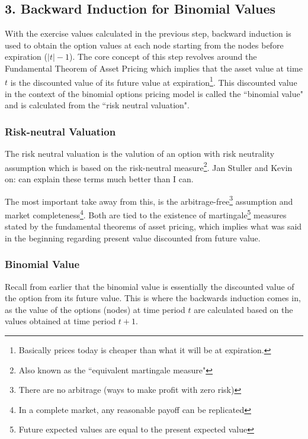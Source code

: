 \documentclass[12pt, letterpaper]{article}\usepackage{float}
\begin{document}
\pagebreak
\subsection*{3. Backward Induction for Binomial Values}
With the exercise values calculated in the previous step, backward induction is used to obtain the option values at each node starting from the nodes before expiration (${\vert t \vert - 1}$).
The core concept of this step revolves around the Fundamental Theorem of Asset Pricing which implies that the asset value at time ${t}$ is the discounted value of its future value at expiration\footnote{Basically prices today is cheaper than what it will be at expiration.}\cite{blythevideo}\cite{ftapwikipedia}.
This discounted value in the context of the binomial options pricing model is called the ``binomial value" and is calculated from the ``risk neutral valuation".

\subsubsection*{Risk-neutral Valuation}
The risk neutral valuation is the valution of an option with risk neutrality assumption\cite{riskneutralvalutionwikipedia} which is based on the risk-neutral measure\footnote{Also known as the ``equivalent martingale measure"}\cite{riskneutralmeasurewikipedia}.
Jan Stuller and Kevin on: \href{https://quant.stackexchange.com/questions/55239/what-is-the-risk-neutral-measure}{\color{blue}{quant.stackexchange}} can explain these terms much better than I can.

\medskip

The most important take away from this, is the arbitrage-free\footnote{There are no arbitrage (ways to make profit with zero risk)} assumption and market completeness\footnote{In a complete market, any reasonable payoff can be replicated\cite{riskneutralmeasurestackexchange}}.
Both are tied to the existence of martingale\footnote{Future expected values are equal to the present expected value} measures stated by the fundamental theorems of asset pricing\cite{ftapwikipedia}, which implies what was said in the beginning regarding present value discounted from future value.


\subsubsection*{Binomial Value}
Recall from earlier that the binomial value is essentially the discounted value of the option from its future value.
This is where the backwards induction comes in, as the value of the options (nodes) at time period ${t}$ are calculated based on the values obtained at time period ${t+1}$.
\end{document}
